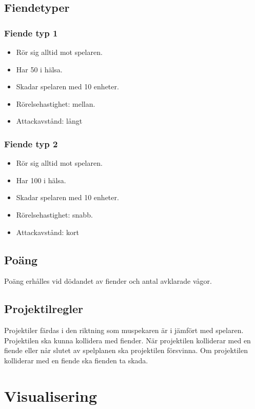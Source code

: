 \documentclass{TDP005mall}
\begin{document}
  \subsection{Fiendetyper}

  \subsubsection{Fiende typ 1}
  \begin{itemize}
    \item Rör sig alltid mot spelaren.
    \item Har 50 i hälsa.
    \item Skadar spelaren med 10 enheter.
    \item Rörelsehastighet: mellan.
    \item Attackavstånd: långt
  \end{itemize}

  \subsubsection{Fiende typ 2}
  \begin{itemize}
    \item Rör sig alltid mot spelaren.
    \item Har 100 i hälsa.
    \item Skadar spelaren med 10 enheter.
    \item Rörelsehastighet: snabb.
    \item Attackavstånd: kort
  \end{itemize}

  \subsection{Poäng}
  Poäng erhålles vid dödandet av fiender och antal avklarade vågor.

  \subsection{Projektilregler}
  Projektiler färdas i den riktning som muspekaren är i jämfört med spelaren.
  Projektilen ska kunna kollidera med fiender.
  När projektilen kolliderar med en fiende eller når slutet av spelplanen ska projektilen försvinna.
  Om projektilen kolliderar med en fiende ska fienden ta skada.

  \section{Visualisering}
\end{document}
